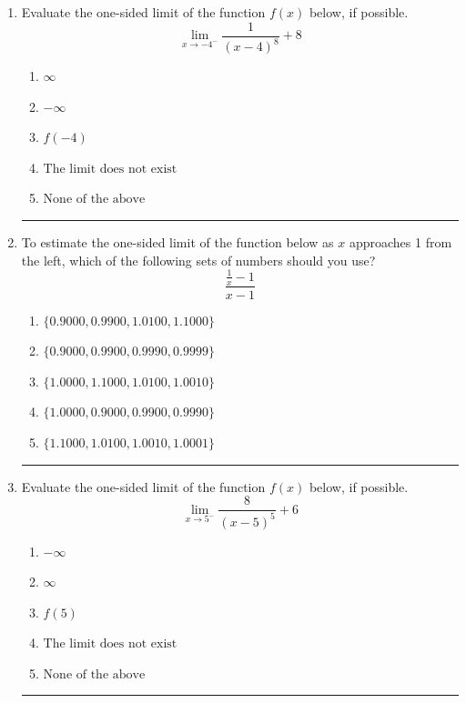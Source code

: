 \documentclass[14pt]{extbook}
\newcommand{\litem}[1]{\item#1\hspace*{-1cm}\rule{\textwidth}{0.4pt}}
\begin{document}
\begin{enumerate}
\litem{
Evaluate the one-sided limit of the function $f(x)$ below, if possible.\[ \lim_{x \rightarrow -4^-} \frac{1}{(x-4)^8}+8 \]\begin{enumerate}[label=\Alph*.]
\item \( \infty \)
\item \( -\infty \)
\item \( f(-4) \)
\item \( \text{The limit does not exist} \)
\item \( \text{None of the above} \)

\end{enumerate} }
\litem{
To estimate the one-sided limit of the function below as $x$ approaches 1 from the left, which of the following sets of numbers should you use?\[ \frac{\frac{1}{x} - 1}{x - 1} \]\begin{enumerate}[label=\Alph*.]
\item \( \{ 0.9000, 0.9900, 1.0100, 1.1000 \} \)
\item \( \{ 0.9000, 0.9900, 0.9990, 0.9999 \} \)
\item \( \{ 1.0000, 1.1000, 1.0100, 1.0010 \} \)
\item \( \{ 1.0000, 0.9000, 0.9900, 0.9990 \} \)
\item \( \{ 1.1000, 1.0100, 1.0010, 1.0001 \} \)

\end{enumerate} }
\litem{
Evaluate the one-sided limit of the function $f(x)$ below, if possible.\[ \lim_{x \rightarrow 5^-} \frac{8}{(x-5)^5}+6 \]\begin{enumerate}[label=\Alph*.]
\item \( -\infty \)
\item \( \infty \)
\item \( f(5) \)
\item \( \text{The limit does not exist} \)
\item \( \text{None of the above} \)


\end{enumerate}}
\end{enumerate}
\end{document}
